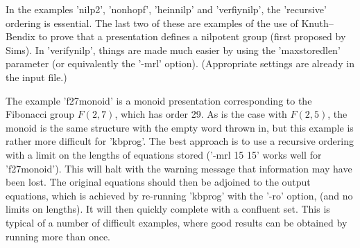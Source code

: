 In the examples 'nilp2', 'nonhopf', 'heinnilp' and 'verfiynilp', the
'recursive' ordering is essential. The last two of these are examples of
the use of Knuth--Bendix to prove that a presentation defines a nilpotent
group (first proposed by Sims). In 'verifynilp', things are made much
easier by using the 'maxstoredlen' parameter (or equivalently the '-mrl'
option). (Appropriate settings are already in the input file.)

The example 'f27monoid' is a monoid presentation
corresponding to the Fibonacci group $F(2,7)$, which has order 29.  As is
the case with $F(2,5)$, the monoid is the same structure with the empty
word thrown in, but this example is rather more difficult for 'kbprog'.
The best approach is to use a recursive ordering with a limit on the
lengths of equations stored ('-mrl 15 15' works well for 'f27monoid').
This will halt with the warning message that information may have been lost.
The original equations should then be adjoined to the output equations,
which is achieved by re-running 'kbprog' with the '-ro' option,
(and no limits on lengths).
It will then quickly complete with a confluent set. This is typical of a
number of difficult examples, where good results can be obtained by running
more than once.
